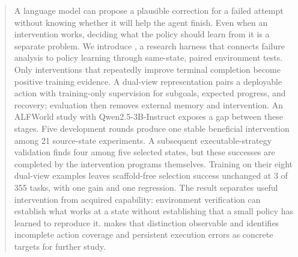 \begin{abstract}
A language model can propose a plausible correction for a failed attempt without knowing whether it will help the agent finish. Even when an intervention works, deciding what the policy should learn from it is a separate problem. We introduce \method{}, a research harness that connects failure analysis to policy learning through same-state, paired environment tests. Only interventions that repeatedly improve terminal completion become positive training evidence. A dual-view representation pairs a deployable action with training-only supervision for subgoals, expected progress, and recovery; evaluation then removes external memory and intervention. An ALFWorld study with Qwen2.5-3B-Instruct exposes a gap between these stages. Five development rounds produce one stable beneficial intervention among 21 source-state experiments. A subsequent executable-strategy validation finds four among five selected states, but these successes are completed by the intervention programs themselves. Training on their eight dual-view examples leaves scaffold-free selection success unchanged at 3 of 355 tasks, with one gain and one regression. The result separates useful intervention from acquired capability: environment verification can establish what works at a state without establishing that a small policy has learned to reproduce it. \method{} makes that distinction observable and identifies incomplete action coverage and persistent execution errors as concrete targets for further study.
\end{abstract}
